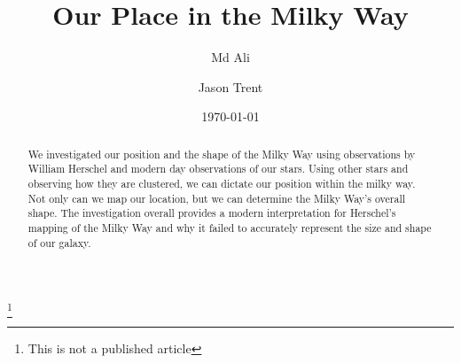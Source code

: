 \documentclass[%
 reprint,
 amsmath,amssymb,
 aps,
]{revtex4-1}
\begin{document}

\title{Our Place in the Milky Way} %
\thanks{This is not a published article}%

\author{Md Ali}
\author{Jason Trent}%
%


\date{\today}%

\begin{abstract}
We investigated our position and the shape of the Milky Way using observations by William Herschel 
and modern day observations of our stars. Using other stars and observing how they are clustered, 
we can dictate our position within the milky way. Not only can we map our location, but we can determine
the Milky Way's overall shape. The investigation overall provides a modern interpretation for Herschel's mapping of the 
Milky Way and why it failed to accurately represent the size and shape of our galaxy.
\end{abstract}

\maketitle

\end{document}
